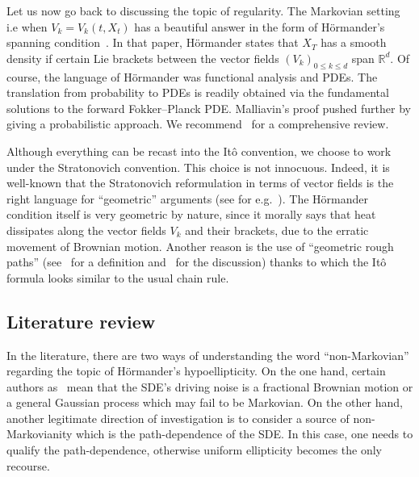 \documentclass[11pt]{article}
\theoremstyle{definition}
\numberwithin{equation}{section}
\numberwithin{figure}{section}
\numberwithin{table}{section}
\newcommand*\R{\mathbb{R}}
\begin{document}
Let us now go back to discussing the topic of regularity. The Markovian setting i.e when $V_k = V_k(t,X_t)$ has a beautiful answer in the form of H\"ormander's spanning condition~\cite{hormander1967}. In that paper, H\"ormander states that $X_T$ has a smooth density if certain Lie brackets between the vector fields $\left(V_k \right)_{0 \leq k \leq d}$ span $\R^d$. Of course, the language of H\"ormander was functional analysis and PDEs. The translation from probability to PDEs is readily obtained via the fundamental solutions to the forward Fokker--Planck PDE. Malliavin's proof pushed further by giving a probabilistic approach. We recommend~\cite{Hairer11} for a comprehensive review.


Although everything can be recast into the Itô convention, we choose to work under the Stratonovich convention. This choice is not innocuous. Indeed, it is well-known that the Stratonovich reformulation in terms of vector fields is the right language for ``geometric'' arguments (see for e.g.~\cite{Hsu}). The H\"ormander condition itself is very geometric by nature, since it morally says that heat dissipates along the vector fields $V_k$ and their brackets, due to the erratic movement of Brownian motion. Another reason is the use of ``geometric rough paths'' (see~\cite[Chapter~2.2]{FH14} for a definition and~\cite[Chapter~3]{FH14} for the discussion) thanks to which the Itô formula looks similar to the usual chain rule.

\subsection*{Literature review}
In the literature, there are two ways of understanding the word ``non-Markovian'' regarding the topic of H\"ormander's hypoellipticity. On the one hand, certain authors as~\cite{CT10,CHLT15,HP13} mean that the SDE's driving noise is a fractional Brownian motion or a general Gaussian process which may fail to be Markovian. On the other hand, another legitimate direction of investigation is to consider a source of non-Markovianity which is the path-dependence of the SDE. In this case, one needs to qualify the path-dependence, otherwise uniform ellipticity becomes the only recourse.
\end{document}
